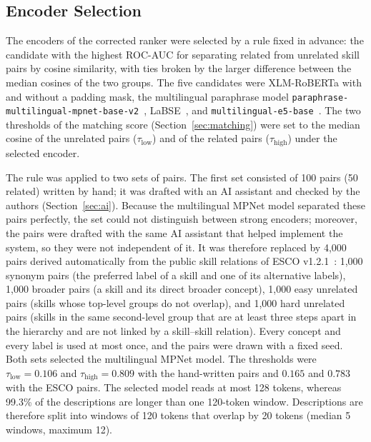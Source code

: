 \documentclass[CHICAGO]{USG}
\begin{document}
\subsection{Encoder Selection}
\label{sec:encoder}
The encoders of the corrected ranker were selected by a rule fixed in advance: the candidate with the highest ROC-AUC for separating related from unrelated skill pairs by cosine similarity, with ties broken by the larger difference between the median cosines of the two groups. The five candidates were XLM-RoBERTa with and without a padding mask, the multilingual paraphrase model \texttt{paraphrase-multilingual-mpnet-base-v2}~\citep{reimers2020}, LaBSE~\citep{feng2022}, and \texttt{multilingual-e5-base}~\citep{wang2024me5}. %
The two thresholds of the matching score (Section~\ref{sec:matching}) were set to the median cosine of the unrelated pairs ($\tau_{\mathrm{low}}$) and of the related pairs ($\tau_{\mathrm{high}}$) under the selected encoder. %

The rule was applied to two sets of pairs. The first set consisted of 100 pairs (50 related) written by hand; it was drafted with an AI assistant and checked by the authors (Section~\ref{sec:ai}). %
Because the multilingual MPNet model separated these pairs perfectly, the set could not distinguish between strong encoders; moreover, the pairs were drafted with the same AI assistant that helped implement the system, so they were not independent of it. It was therefore replaced by 4{,}000 pairs derived automatically from the public skill relations of ESCO v1.2.1~\citep{esco}: 1{,}000 synonym pairs (the preferred label of a skill and one of its alternative labels), 1{,}000 broader pairs (a skill and its direct broader concept), 1{,}000 easy unrelated pairs (skills whose top-level groups do not overlap), and 1{,}000 hard unrelated pairs (skills in the same second-level group that are at least three steps apart in the hierarchy and are not linked by a skill--skill relation). Every concept and every label is used at most once, and the pairs were drawn with a fixed seed. %
Both sets selected the multilingual MPNet model. The thresholds were $\tau_{\mathrm{low}}=0.106$ and $\tau_{\mathrm{high}}=0.809$ with the hand-written pairs and $0.165$ and $0.783$ with the ESCO pairs. %
The selected model reads at most 128 tokens, whereas 99.3\% of the descriptions are longer than one 120-token window. %
Descriptions are therefore split into windows of 120 tokens that overlap by 20 tokens (median 5 windows, maximum 12). %
\end{document}
